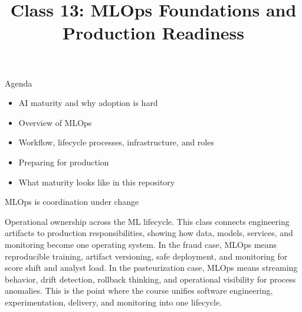 

\title{Class 13: MLOps Foundations and Production Readiness}
\author{\coursename}
\date{}



\frame{\titlepage \coursefooter}

\begin{frame}{Agenda}
\begin{itemize}
\item AI maturity and why adoption is hard
\item Overview of MLOps
\item Workflow, lifecycle processes, infrastructure, and roles
\item Preparing for production
\item What maturity looks like in this repository
\end{itemize}
\coursefooter
\end{frame}

\begin{frame}{MLOps is coordination under change}
\coursefooter
\end{frame}

\coursecontextframe
{Operational ownership across the ML lifecycle.}
{This class connects engineering artifacts to production responsibilities, showing how data, models, services, and monitoring become one operating system.}
{In the fraud case, MLOps means reproducible training, artifact versioning, safe deployment, and monitoring for score shift and analyst load.}
{In the pasteurization case, MLOps means streaming behavior, drift detection, rollback thinking, and operational visibility for process anomalies.}
{This is the point where the course unifies software engineering, experimentation, delivery, and monitoring into one lifecycle.}

